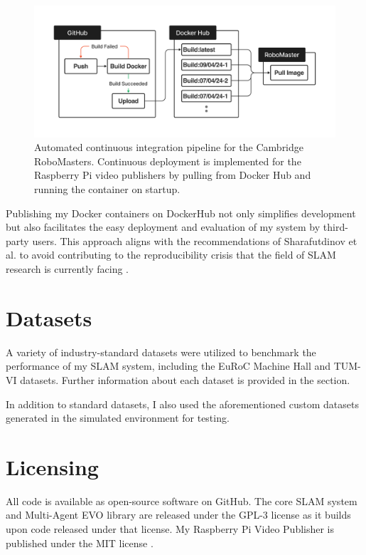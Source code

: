 
\begin{figure}[h]
    \centering
    \includegraphics[trim=5cm 5cm 5cm 5cm, scale=0.2]{figures/cicd_diagram.pdf}

    \caption{Automated continuous integration pipeline for the Cambridge RoboMasters. Continuous deployment is implemented for the Raspberry Pi video publishers by pulling from Docker Hub and running the container on startup.}
    \label{fig:cicd-diagram}
\end{figure}

Publishing my Docker containers on DockerHub not only simplifies development but also facilitates the easy deployment and evaluation of my system by third-party users. This approach aligns with the recommendations of Sharafutdinov et al. to avoid contributing to the reproducibility crisis that the field of SLAM research is currently facing \autocite{DBLP:journals/corr/abs-2108-01654}.


\section{Datasets}
\label{sec:datasets}
A variety of industry-standard datasets were utilized to benchmark the performance of my SLAM system, including the EuRoC Machine Hall \autocite{burri2016euroc} and TUM-VI \autocite{8593419} datasets. Further information about each dataset is provided in the  section.

In addition to standard datasets, I also used the aforementioned custom datasets generated in the simulated environment for testing.

\section{Licensing}
\label{sec:licensing}
All code is available as open-source software on GitHub. The core SLAM system and Multi-Agent EVO library are released under the GPL-3 license \autocite{gplv3} as it builds upon code released under that license. My Raspberry Pi Video Publisher is published under the MIT license \autocite{mit}.